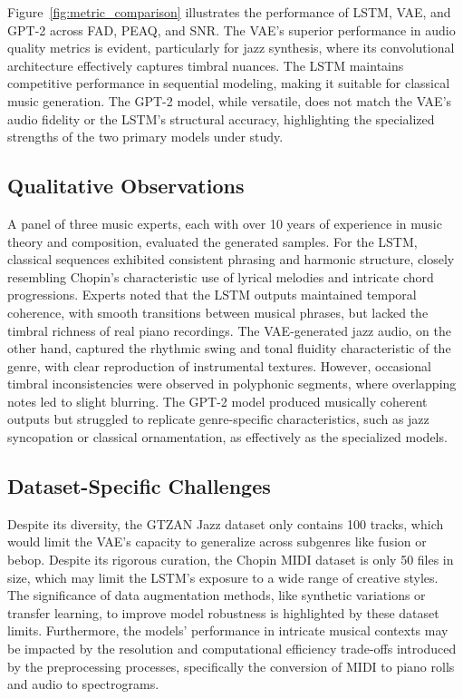 \documentclass[conference]{IEEEtran}
\begin{document}
Figure~\ref{fig:metric_comparison} illustrates the performance of LSTM, VAE, and GPT-2 across FAD, PEAQ, and SNR. The VAE’s superior performance in audio quality metrics is evident, particularly for jazz synthesis, where its convolutional architecture effectively captures timbral nuances. The LSTM maintains competitive performance in sequential modeling, making it suitable for classical music generation. The GPT-2 model, while versatile, does not match the VAE’s audio fidelity or the LSTM’s structural accuracy, highlighting the specialized strengths of the two primary models under study.

\subsection{Qualitative Observations}
A panel of three music experts, each with over 10 years of experience in music theory and composition, evaluated the generated samples. For the LSTM, classical sequences exhibited consistent phrasing and harmonic structure, closely resembling Chopin’s characteristic use of lyrical melodies and intricate chord progressions. Experts noted that the LSTM outputs maintained temporal coherence, with smooth transitions between musical phrases, but lacked the timbral richness of real piano recordings. The VAE-generated jazz audio, on the other hand, captured the rhythmic swing and tonal fluidity characteristic of the genre, with clear reproduction of instrumental textures. However, occasional timbral inconsistencies were observed in polyphonic segments, where overlapping notes led to slight blurring. The GPT-2 model produced musically coherent outputs but struggled to replicate genre-specific characteristics, such as jazz syncopation or classical ornamentation, as effectively as the specialized models.

\subsection{Dataset-Specific Challenges}
Despite its diversity, the GTZAN Jazz dataset only contains 100 tracks, which would limit the VAE's capacity to generalize across subgenres like fusion or bebop.  Despite its rigorous curation, the Chopin MIDI dataset is only 50 files in size, which may limit the LSTM's exposure to a wide range of creative styles.  The significance of data augmentation methods, like synthetic variations or transfer learning, to improve model robustness is highlighted by these dataset limits.  Furthermore, the models' performance in intricate musical contexts may be impacted by the resolution and computational efficiency trade-offs introduced by the preprocessing processes, specifically the conversion of MIDI to piano rolls and audio to spectrograms.
\end{document}
